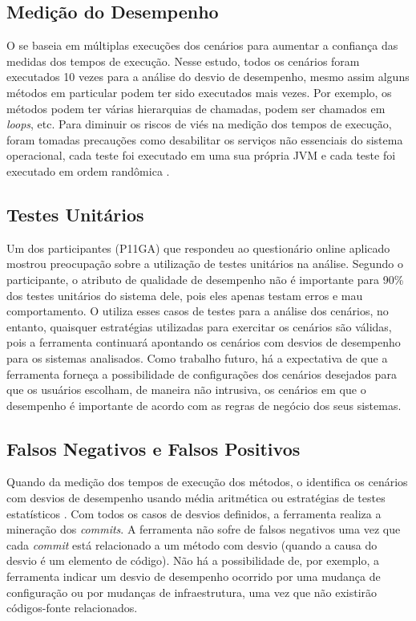 \subsection{Medição do Desempenho}

O \textit{\perfMinerName} se baseia em múltiplas execuções dos cenários para aumentar a confiança das medidas dos tempos de execução. Nesse estudo, todos os cenários foram executados 10 vezes para a análise do desvio de desempenho, mesmo assim alguns métodos em particular podem ter sido executados mais vezes. Por exemplo, os métodos podem ter várias hierarquias de chamadas, podem ser chamados em \textit{loops}, etc. Para diminuir os riscos de viés na medição dos tempos de execução, foram tomadas precauções como desabilitar os serviços não essenciais do sistema operacional, cada teste foi executado em uma sua própria JVM e cada teste foi executado em ordem randômica \cite{Pinto2015}.

\subsection{Testes Unitários} \label{subsec:avaliacao-consideracoes-testes-unitarios}

Um dos participantes (P11GA) que respondeu ao questionário online aplicado mostrou preocupação sobre a utilização de testes unitários na análise. Segundo o participante, o atributo de qualidade de desempenho não é importante para 90\% dos testes unitários do sistema dele, pois eles apenas testam erros e mau comportamento. O \textit{\perfMinerName} utiliza esses casos de testes para a análise dos cenários, no entanto, quaisquer estratégias utilizadas para exercitar os cenários são válidas, pois a ferramenta continuará apontando os cenários com desvios de desempenho para os sistemas analisados. Como trabalho futuro, há a expectativa de que a ferramenta forneça a possibilidade de configurações dos cenários desejados para que os usuários escolham, de maneira não intrusiva, os cenários em que o desempenho é importante de acordo com as regras de negócio dos seus sistemas.

\subsection{Falsos Negativos e Falsos Positivos}

Quando da medição dos tempos de execução dos métodos, o \textit{\perfMinerName} identifica os cenários com desvios de desempenho usando média aritmética ou estratégias de testes estatísticos \cite{Pinto2015}. Com todos os casos de desvios definidos, a ferramenta realiza a mineração dos \textit{commits}. A ferramenta não sofre de falsos negativos uma vez que cada \textit{commit} está relacionado a um método com desvio (quando a causa do desvio é um elemento de código). Não há a possibilidade de, por exemplo, a ferramenta indicar um desvio de desempenho ocorrido por uma mudança de configuração ou por mudanças de infraestrutura, uma vez que não existirão códigos-fonte relacionados.

